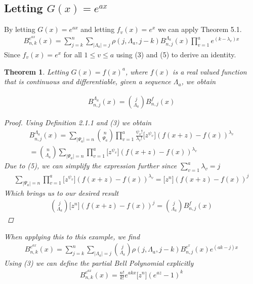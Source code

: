 \documentclass[11pt]{article}
\theoremstyle{plain}
\newtheorem{theorem}{Theorem}[section]   %
\theoremstyle{definition}
\begin{document}
\subsection{Letting $G(x) = e^{ax}$}
By letting $G(x) = e^{ax}$ and letting $f_v(x) = e^x$ we can apply Theorem 5.1.
\begin{align*}
    B_{n,k}^{e^{ax}}(x) = \sum_{j=k}^n \sum_{|\Lambda_a|=j} \rho(j,\Lambda_a,j-k) B_{n,j}^{\Lambda_a}(x) \prod_{v=1}^a e^{(k-\lambda_v)x}
\end{align*}
Since $f_v(x) = e^x$ for all $1\le v\le a$ using (3) and (5) to derive an identity.
\begin{theorem}
Letting $G(x) = f(x)^a$, where $f(x)$ is a real valued function that is continuous and differentiable, given a sequence $\Lambda_a$, we obtain

\begin{align*}
B_{n,j}^{\Lambda_a}(x) = \binom{j}{\Lambda_a}B_{n,j}^f(x)
\end{align*}
\begin{proof}
Using Definition 2.1.1 and (3) we obtain
\begin{align*}
B_{n,j}^{\Lambda_a}(x) = \sum_{|\Psi_a|=n} \binom{n}{\Psi_a} \prod_{v=1}^a \frac{\psi_v!}{\lambda_v!}\big[z^{\psi_v}\big] (f(x+z)-f(x))^{\lambda_v} \\
= \binom{n}{\Lambda_a} \sum_{|\Psi_a|=n} \prod_{v=1}^a \big[z^{\psi_v}\big](f(x+z)-f(x))^{\lambda_v}
\end{align*}
Due to (5), we can simplify the expression further since $\sum_{v=1}^a \lambda_v = j$
\begin{align*}
\sum_{|\Psi_a|=n}\prod_{v=1}^a \big[z^{\psi_v}\big](f(x+z)-f(x))^{\lambda_v} = \big[z^{n}\big](f(x+z)-f(x))^{j}
\end{align*}
Which brings us to our desired result
\begin{align*}
\binom{j}{\Lambda_a}\big[z^{n}\big](f(x+z)-f(x))^{j}=\binom{j}{\Lambda_a}B_{n,j}^f(x)
\end{align*}
\end{proof}
When applying this to this example, we find
\begin{align*}
B_{n,k}^{e^{ax}}(x) = \sum_{j=k}^n \sum_{|\Lambda_a| = j} \binom{j}{\Lambda_a} \rho(j,\Lambda_a,j-k)B_{n,j}^{e^x}(x) e^{(ak-j)x}
\end{align*}
Using (3) we can define the partial Bell Polynomial explicitly
\begin{align*}
B_{n,k}^{e^{ax}}(x) = \frac{n!}{k!}e^{akx}\big[z^n\big](e^{az}-1)^k \\

\end{align*}
\end{theorem}
\end{document}
